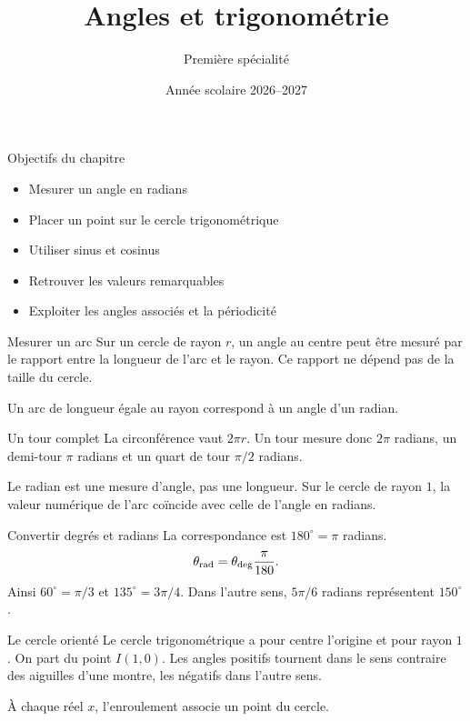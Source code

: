 \documentclass[aspectratio=169,12pt]{beamer}
\title{Angles et trigonométrie}
\subtitle{Première spécialité}
\date{Année scolaire 2026--2027}
\begin{document}
\begin{frame}\titlepage\end{frame}
\begin{frame}{Objectifs du chapitre}\begin{itemize}
\item Mesurer un angle en radians
\item Placer un point sur le cercle trigonométrique
\item Utiliser sinus et cosinus
\item Retrouver les valeurs remarquables
\item Exploiter les angles associés et la périodicité
\end{itemize}\end{frame}
\renewcommand{\slidekind}{COMPRENDRE}
\begin{frame}[t,fragile]{Mesurer un arc}
Sur un cercle de rayon $r$, un angle au centre peut être mesuré par le rapport entre la longueur de l’arc et le rayon. Ce rapport ne dépend pas de la taille du cercle.\medskip\par Un arc de longueur égale au rayon correspond à un angle d’un radian.
\end{frame}
\renewcommand{\slidekind}{COMPRENDRE}
\begin{frame}[t,fragile]{Un tour complet}
La circonférence vaut $2\pi r$. Un tour mesure donc $2\pi$ radians, un demi-tour $\pi$ radians et un quart de tour $\pi/2$ radians.\medskip\par Le radian est une mesure d’angle, pas une longueur. Sur le cercle de rayon $1$, la valeur numérique de l’arc coïncide avec celle de l’angle en radians.
\end{frame}
\renewcommand{\slidekind}{COMPRENDRE}
\begin{frame}[t,fragile]{Convertir degrés et radians}
La correspondance est $180^\circ=\pi$ radians.\[\theta_{\rm rad}=\theta_{\rm deg}\frac\pi{180}.\] Ainsi $60^\circ=\pi/3$ et $135^\circ=3\pi/4$. Dans l’autre sens, $5\pi/6$ radians représentent $150^\circ$.
\end{frame}
\renewcommand{\slidekind}{COMPRENDRE}
\begin{frame}[t,fragile]{Le cercle orienté}
Le cercle trigonométrique a pour centre l’origine et pour rayon $1$. On part du point $I(1,0)$. Les angles positifs tournent dans le sens contraire des aiguilles d’une montre, les négatifs dans l’autre sens.\medskip\par À chaque réel $x$, l’enroulement associe un point du cercle.
\end{frame}
\end{document}
